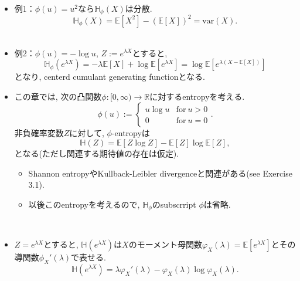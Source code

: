 \documentclass[aspectratio=169, dvipdfmx]{beamer}
\newcommand{\ex}{\mathbb{E}}
\newcommand{\var}{\mathrm{var}}
\begin{document}
\begin{frame}
\begin{itemize}
    \item 例1：$\phi(u) = u^2$なら$\mathbb{H}_\phi(X)$は分散.
        \[ \mathbb{H}_\phi(X) = \ex[X^2] - (\ex[X])^2 = \var(X).\]
    　
    \item 例2：$\phi(u) = -\log u$, $Z := e^{\lambda X}$とすると,
        \[ \mathbb{H}_\phi(e^{\lambda X})  = -\lambda \ex[X] + \log \ex[e^{\lambda X}] = \log\ex[e^{\lambda(X-\ex[X])}]\]
        となり, centerd cumulant generating functionとなる.
\end{itemize}
\end{frame}

\begin{frame}
    \begin{itemize}
        \item この章では, 次の凸関数$\phi:[0,\infty)\to\mathbb{R}$に対するentropyを考える.
        \[\phi(u) := 
            \begin{cases}
                u\log u & \mathrm{for} \ u > 0\\
                0       & \mathrm{for} \ u = 0
            \end{cases}.\tag{3.1}
        \]
        非負確率変数$Z$に対して, $\phi$-entropyは
        \[ \mathbb{H}(Z) = \ex[Z\log Z] - \ex[Z]\log\ex[Z], \tag{3.2}\]
        となる(ただし関連する期待値の存在は仮定). 
        \begin{itemize}
            \item Shannon entropyやKullback-Leibler divergenceと関連がある(see Exercise 3.1).
            \item 以後このentropyを考えるので, $\mathbb{H}_\phi$のsubscrript $\phi$は省略.
        \end{itemize}
        　
        \item $Z = e^{\lambda X}$とすると, $\mathbb{H}(e^{\lambda X})$は$X$のモーメント母関数$\varphi_X(\lambda)=\ex[e^{\lambda X}]$とその導関数$\phi_X'(\lambda)$で表せる.
        \[\mathbb{H}(e^{\lambda X}) = \lambda \varphi_X'(\lambda) - \varphi_X(\lambda)\log\varphi_X(\lambda). \tag{3.3}\]
    \end{itemize}
\end{frame}
\end{document}
